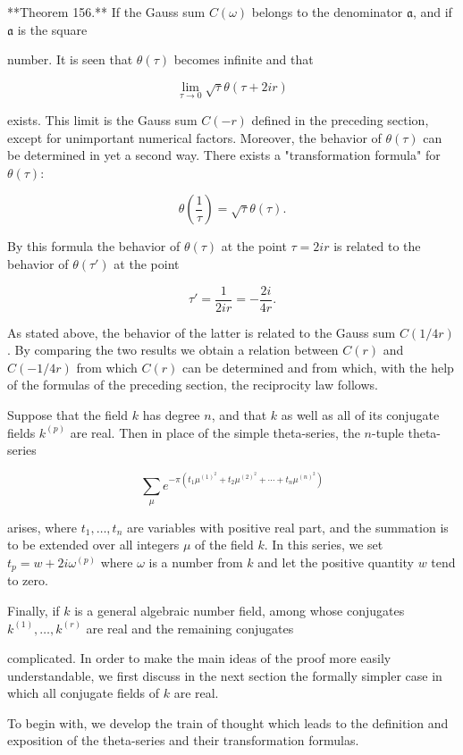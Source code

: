 **Theorem 156.** If the Gauss sum $C(\omega)$ belongs to the denominator $\mathfrak{a}$, and if $\mathfrak{a}$ is the square

number. It is seen that $\theta(\tau)$ becomes infinite and that

$$\lim_{\tau \to 0} \sqrt{\tau} \theta(\tau + 2ir)$$

exists. This limit is the Gauss sum $C(-r)$ defined in the preceding section, except for unimportant numerical factors. Moreover, the behavior of $\theta(\tau)$ can be determined in yet a second way. There exists a "transformation formula" for $\theta(\tau)$:

$$\theta\left(\frac{1}{\tau}\right) = \sqrt{\tau} \theta(\tau).$$

By this formula the behavior of $\theta(\tau)$ at the point $\tau = 2ir$ is related to the behavior of $\theta(\tau')$ at the point

$$\tau' = \frac{1}{2ir} = -\frac{2i}{4r}.$$

As stated above, the behavior of the latter is related to the Gauss sum $C(1/4r)$. By comparing the two results we obtain a relation between $C(r)$ and $C(-1/4r)$ from which $C(r)$ can be determined and from which, with the help of the formulas of the preceding section, the reciprocity law follows.

Suppose that the field $k$ has degree $n$, and that $k$ as well as all of its conjugate fields $k^{(p)}$ are real. Then in place of the simple theta-series, the $n$-tuple theta-series

$$\sum_{\mu} e^{-\pi(t_1\mu^{(1)}^2 + t_2\mu^{(2)}^2 + \cdots + t_n\mu^{(n)}^2)}$$

arises, where $t_1, \ldots, t_n$ are variables with positive real part, and the summation is to be extended over all integers $\mu$ of the field $k$. In this series, we set $t_p = w + 2i\omega^{(p)}$ where $\omega$ is a number from $k$ and let the positive quantity $w$ tend to zero.

Finally, if $k$ is a general algebraic number field, among whose conjugates $k^{(1)}, \ldots, k^{(r)}$ are real and the remaining conjugates

complicated. In order to make the main ideas of the proof more easily understandable, we first discuss in the next section the formally simpler case in which all conjugate fields of $k$ are real.

To begin with, we develop the train of thought which leads to the definition and exposition of the theta-series and their transformation formulas.

